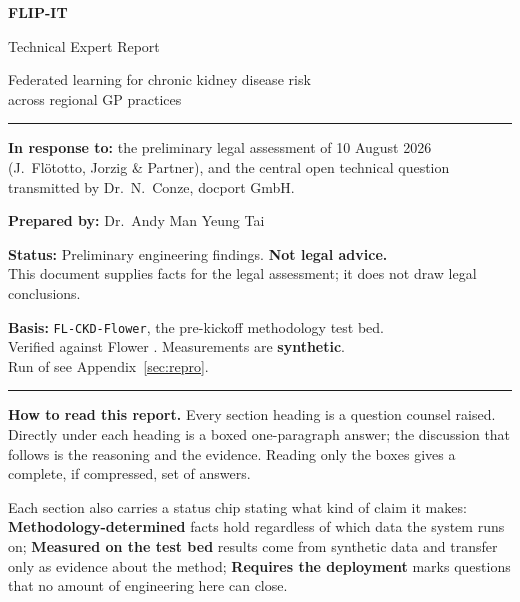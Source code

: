 \documentclass[11pt,a4paper]{article}
\begin{document}
\begin{titlepage}
\vspace*{2cm}
{\Huge\bfseries FLIP-IT\par}
\vspace{6pt}
{\LARGE Technical Expert Report\par}
\vspace{18pt}
{\large Federated learning for chronic kidney disease risk\\
across regional GP practices\par}
\vspace{24pt}
\noindent\rule{\textwidth}{0.6pt}
\vspace{12pt}

{\large\bfseries In response to:} the preliminary legal assessment of 10 August 2026\\
(J.~Fl\"ototto, Jorzig \& Partner), and the central open technical question\\
transmitted by Dr.~N.~Conze, docport GmbH.

\vspace{18pt}
{\large\bfseries Prepared by:} Dr.~Andy Man Yeung Tai

\vspace{18pt}
{\large\bfseries Status:} Preliminary engineering findings. \textbf{Not legal advice.}\\
This document supplies facts for the legal assessment; it does not draw legal conclusions.

\vspace{12pt}
{\large\bfseries Basis:} \texttt{FL-CKD-Flower}, the pre-kickoff methodology test bed.\\
Verified against Flower \FlwrVersion{}. Measurements are \textbf{synthetic}.\\
Run of \RunDate{} see Appendix~\ref{sec:repro}.

\vspace{12pt}
\noindent\rule{\textwidth}{0.6pt}

\vfill
\begin{answerbox}
\small
\textbf{How to read this report.} Every section heading is a question counsel raised. Directly
under each heading is a boxed one-paragraph answer; the discussion that follows is the reasoning and
the evidence. Reading only the boxes gives a complete, if compressed, set of answers.

Each section also carries a status chip stating what kind of claim it makes:
\textcolor{accent}{\textbf{Methodology-determined}} facts hold regardless of which data the system
runs on; \textcolor{accent}{\textbf{Measured on the test bed}} results come from synthetic data and
transfer only as evidence about the method; \textcolor{warn}{\textbf{Requires the deployment}} marks
questions that no amount of engineering here can close.
\end{answerbox}
\end{titlepage}
\end{document}
